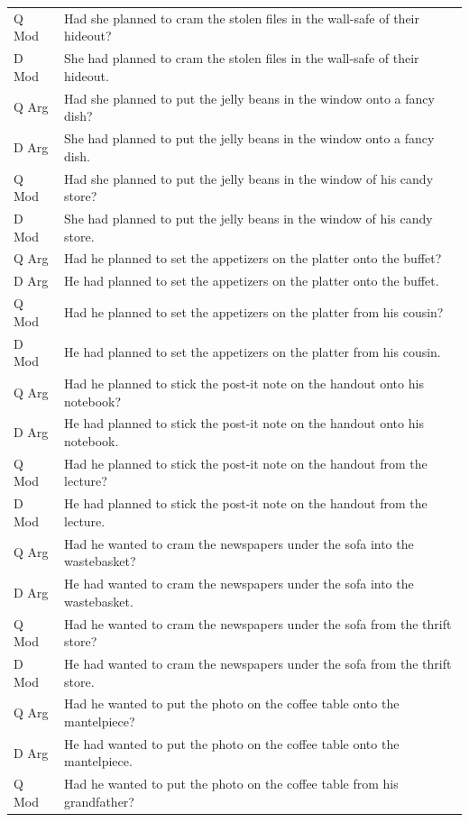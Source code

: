 \documentclass[12pt,oneside]{book}
\begin{document}
\begin{longtable}{ll}
Q Mod & Had she planned to cram the stolen files in the wall-safe of their hideout?\\
D Mod & She had planned to cram the stolen files in the wall-safe of their hideout.\\
\addlinespace
Q Arg & Had she planned to put the jelly beans in the window onto a fancy dish?\\
D Arg & She had planned to put the jelly beans in the window onto a fancy dish.\\
Q Mod & Had she planned to put the jelly beans in the window of his candy store?\\
D Mod & She had planned to put the jelly beans in the window of his candy store.\\
\addlinespace
Q Arg & Had he planned to set the appetizers on the platter onto the buffet?\\
D Arg & He had planned to set the appetizers on the platter onto the buffet.\\
Q Mod & Had he planned to set the appetizers on the platter from his cousin?\\
D Mod & He had planned to set the appetizers on the platter from his cousin.\\
\addlinespace
Q Arg & Had he planned to stick the post-it note on the handout onto his notebook?\\
D Arg & He had planned to stick the post-it note on the handout onto his notebook.\\
Q Mod & Had he planned to stick the post-it note on the handout from the lecture?\\
D Mod & He had planned to stick the post-it note on the handout from the lecture.\\
\addlinespace
Q Arg & Had he wanted to cram the newspapers under the sofa into the wastebasket?\\
D Arg & He had wanted to cram the newspapers under the sofa into the wastebasket.\\
Q Mod & Had he wanted to cram the newspapers under the sofa from the thrift store?\\
D Mod & He had wanted to cram the newspapers under the sofa from the thrift store.\\
\addlinespace
Q Arg & Had he wanted to put the photo on the coffee table onto the mantelpiece?\\
D Arg & He had wanted to put the photo on the coffee table onto the mantelpiece.\\
Q Mod & Had he wanted to put the photo on the coffee table from his grandfather?\\

\end{longtable}
\end{document}
